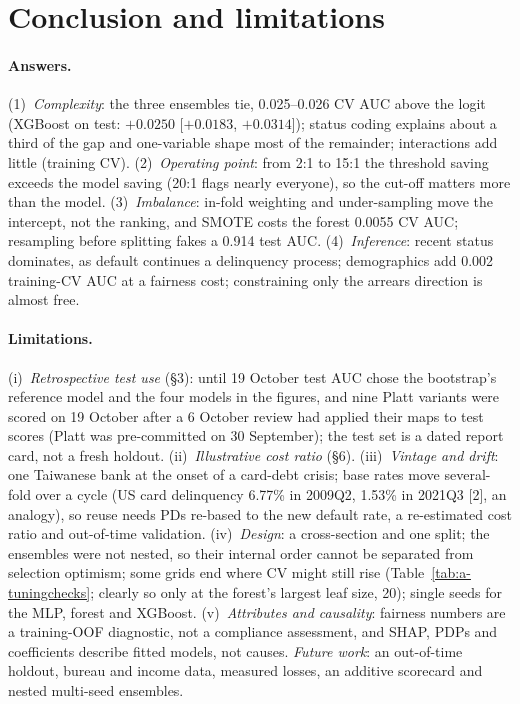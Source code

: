 \section{Conclusion and limitations}

\paragraph{Answers.}
(1)~\emph{Complexity}: the three ensembles tie, 0.025--0.026 CV AUC above the logit (XGBoost on test: $+0.0250$ [$+0.0183$, $+0.0314$]); status coding explains about a third of the gap and one-variable shape most of the remainder; interactions add little (training CV). (2)~\emph{Operating point}: from 2:1 to 15:1 the threshold saving exceeds the model saving (20:1 flags nearly everyone), so the cut-off matters more than the model. (3)~\emph{Imbalance}: in-fold weighting and under-sampling move the intercept, not the ranking, and SMOTE costs the forest 0.0055 CV AUC; resampling before splitting fakes a 0.914 test AUC. (4)~\emph{Inference}: recent status dominates, as default continues a delinquency process; demographics add 0.002 training-CV AUC at a fairness cost; constraining only the arrears direction is almost free.

\paragraph{Limitations.}
(i)~\emph{Retrospective test use} (\S3): until 19 October test AUC chose the bootstrap's reference model and the four models in the figures, and nine Platt variants were scored on 19 October after a 6 October review had applied their maps to test scores (Platt was pre-committed on 30 September); the test set is a dated report card, not a fresh holdout. (ii)~\emph{Illustrative cost ratio} (\S6). (iii)~\emph{Vintage and drift}: one Taiwanese bank at the onset of a card-debt crisis; base rates move several-fold over a cycle (US card delinquency 6.77\% in 2009Q2, 1.53\% in 2021Q3 [2], an analogy), so reuse needs PDs re-based to the new default rate, a re-estimated cost ratio and out-of-time validation. (iv)~\emph{Design}: a cross-section and one split; the ensembles were not nested, so their internal order cannot be separated from selection optimism; some grids end where CV might still rise (Table~\ref{tab:a-tuningchecks}; clearly so only at the forest's largest leaf size, 20); single seeds for the MLP, forest and XGBoost. (v)~\emph{Attributes and causality}: fairness numbers are a training-OOF diagnostic, not a compliance assessment, and SHAP, PDPs and coefficients describe fitted models, not causes. \emph{Future work}: an out-of-time holdout, bureau and income data, measured losses, an additive scorecard and nested multi-seed ensembles.


